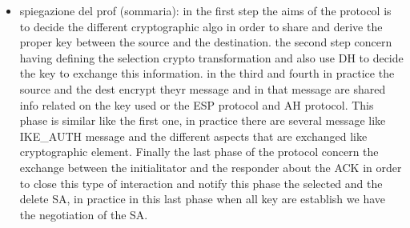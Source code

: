 \documentclass{article}
\begin{document}
\begin{itemize}
\begin{itemize}
\begin{itemize}
\begin{itemize}
                \item spiegazione del prof (sommaria): in the first step the aims of the protocol is to decide the different cryptographic algo in order to share and derive the proper key between the source and the destination. the second step concern having defining the selection crypto transformation and also use DH to decide the key to exchange this information. in the third and fourth in practice the source and the dest encrypt theyr message and in that message are shared info related on the key used or the ESP protocol and AH protocol. This phase is similar like the first one, in practice there are several message like IKE\_AUTH message and the different aspects that are exchanged like cryptographic element. Finally the last phase of the protocol concern the exchange between the initialitator and the responder about the ACK in order to close this type of interaction and notify this phase the selected and the delete SA, in practice in this last phase when all key are establish we have the negotiation of the SA.
            \end{itemize}
        \end{itemize}
    \end{itemize}     
\end{itemize}
\end{document}
